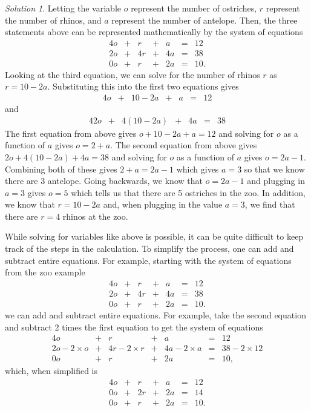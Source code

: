 \documentclass[
]{book}
\theoremstyle{definition}
\theoremstyle{definition}
\theoremstyle{definition}
\theoremstyle{definition}
\theoremstyle{remark}
\newtheorem*{solution}{Solution}
\begin{document}
\begin{solution}
Letting the variable \(o\) represent the number of ostriches, \(r\) represent the number of rhinos, and \(a\) represent the number of antelope. Then, the three statements above can be represented mathematically by the system of equations
\begin{alignat*}{4}
o   & {}+{} &  r  & {}+{} & a  & {}={} & 12 \\
2o  & {}+{} &  4r & {}+{} & 4a & {}={} & 38 \\
0o  & {}+{} &  r  & {}+{} & 2a & {}={} & 10.
\end{alignat*}
Looking at the third equation, we can solve for the number of rhinos \(r\) as \(r = 10 - 2a\). Substituting this into the first two equations gives
\begin{alignat*}{4}
o   & {}+{} &  10 - 2a  & {}+{} & a  & {}={} & 12 
\end{alignat*}
and
\begin{alignat*}{4}
2o  & {}+{} &  4(10 - 2a) & {}+{} & 4a & {}={} & 38 
\end{alignat*}
The first equation from above gives \(o + 10 - 2a + a = 12\) and solving for \(o\) as a function of \(a\) gives \(o = 2 + a\). The second equation from above gives \(2o + 4(10 - 2a) + 4a = 38\) and solving for \(o\) as a function of \(a\) gives \(o = 2a - 1\). Combining both of these gives \(2 + a = 2a - 1\) which gives \(a = 3\) so that we know there are 3 antelope. Going backwards, we know that \(o = 2a - 1\) and plugging in \(a = 3\) gives \(o = 5\) which tells us that there are 5 ostriches in the zoo. In addition, we know that \(r = 10 - 2a\) and, when plugging in the value \(a = 3\), we find that there are \(r = 4\) rhinos at the zoo.

While solving for variables like above is possible, it can be quite difficult to keep track of the steps in the calculation. To simplify the process, one can add and subtract entire equations. For example, starting with the system of equations from the zoo example
\begin{alignat*}{4}
o   & {}+{} &  r  & {}+{} & a  & {}={} & 12 \\
2o  & {}+{} &  4r & {}+{} & 4a & {}={} & 38 \\
0o  & {}+{} &  r  & {}+{} & 2a & {}={} & 10.
\end{alignat*}
we can add and subtract entire equations. For example, take the second equation and subtract 2 times the first equation to get the system of equations
\begin{alignat*}{4}
o   & {}+{} &  r  & {}+{} & a  & {}={} & 12 \\
2o - 2 \times o & {}+{} &  4r - 2 \times r & {}+{} & 4a -2 \times a& {}={} & 38 - 2 \times 12\\
0o  & {}+{} &  r  & {}+{} & 2a & {}={} & 10,
\end{alignat*}
which, when simplified is
\begin{alignat*}{4}
o   & {}+{} &  r  & {}+{} & a  & {}={} & 12 \\
0o  & {}+{} &  2r & {}+{} & 2a & {}={} & 14 \\
0o  & {}+{} &  r  & {}+{} & 2a & {}={} & 10.
\end{alignat*}


\end{solution}
\end{document}
